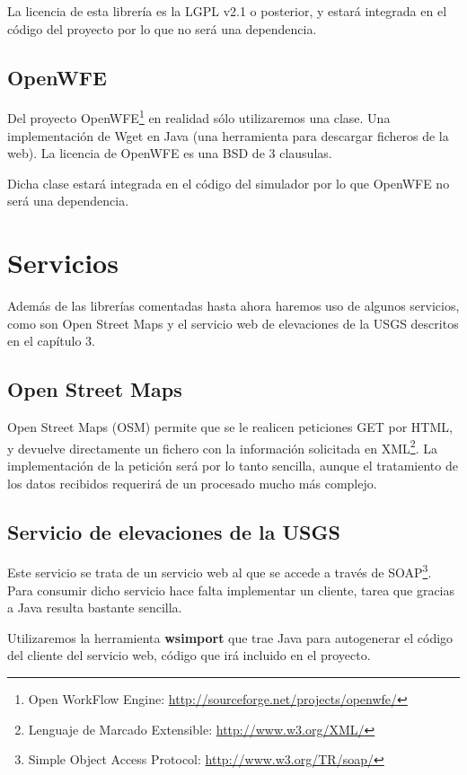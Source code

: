 La licencia de esta librería es la LGPL v2.1 o posterior, y estará integrada en
el código del proyecto por lo que no será una dependencia.

\subsection*{OpenWFE}

Del proyecto OpenWFE\footnote{Open WorkFlow Engine:
\url{http://sourceforge.net/projects/openwfe/}} en realidad sólo utilizaremos
una clase. Una implementación de Wget en Java (una herramienta para descargar
ficheros de la web). La licencia de OpenWFE es una BSD de 3 clausulas.

Dicha clase estará integrada en el código del simulador por lo que OpenWFE no
será una dependencia.

\section*{Servicios}

Además de las librerías comentadas hasta ahora haremos uso de algunos
servicios, como son Open Street Maps y el servicio web de elevaciones de la
USGS descritos en el capítulo 3. %

\subsection*{Open Street Maps}

Open Street Maps (OSM) permite que se le realicen peticiones GET por HTML, y
devuelve directamente un fichero con la información solicitada en
XML\footnote{Lenguaje de Marcado Extensible: \url{http://www.w3.org/XML/}}. La
implementación de la petición será por lo tanto sencilla, aunque el tratamiento
de los datos recibidos requerirá de un procesado mucho más complejo.

\subsection*{Servicio de elevaciones de la USGS}

Este servicio se trata de un servicio web al que se accede a través de
SOAP\footnote{Simple Object Access Protocol: \url{http://www.w3.org/TR/soap/}}.
Para consumir dicho servicio hace falta implementar un cliente, tarea que
gracias a Java resulta bastante sencilla.

Utilizaremos la herramienta {\bf wsimport} que trae Java para autogenerar el
código del cliente del servicio web, código que irá incluido en el proyecto.